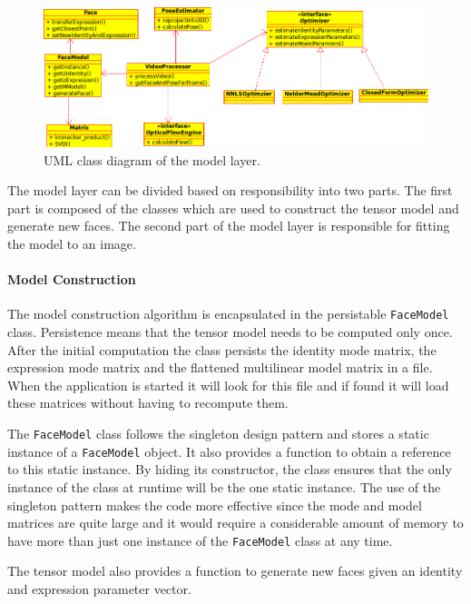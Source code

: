 \documentclass[11pt,a4paper]{report}
\begin{document}
\begin{figure}[H]
\begin{centering}
\includegraphics[scale=0.67]{images/modellayer.png}
\par\end{centering}

\caption{UML class diagram of the model layer.}
\label{fg:modellayer}
\end{figure}

The model layer can be divided based on responsibility into two parts. The first
part is composed of the classes which are used to construct the tensor
model and generate new faces. The second part of the model layer is responsible for fitting the model
to an image.

\paragraph{Model Construction}
The model construction algorithm is encapsulated in the persistable \texttt{FaceModel}
class. Persistence means that the tensor model needs to be computed only once. After
the initial computation the class persists the identity mode
matrix, the expression mode matrix and the flattened multilinear model matrix in
a file. When the application is started it will look for this file and if found
it will load these matrices without having to recompute them. 

The \texttt{FaceModel} class follows the singleton design pattern and stores a static instance of a
\texttt{FaceModel} object. It also provides a function to obtain a reference to
this static instance. By hiding its constructor, the class ensures that the only instance of the
class at runtime will be the one static instance. The use of the singleton
pattern makes the code more effective since the mode and model matrices are
quite large and it would require a considerable amount of memory to have more than just one
instance of the \texttt{FaceModel} class at any time.

The tensor model also provides a function to generate new faces given an identity
and expression parameter vector. 
\end{document}
